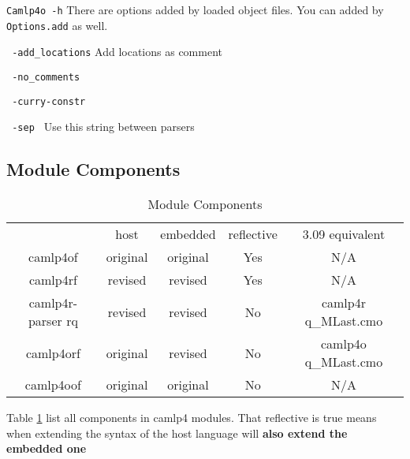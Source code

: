 \verb|Camlp4o -h| There are options added by loaded object files. You
can added by \verb|Options.add| as well.


\verb| -add_locations| Add locations as comment


\verb| -no_comments|


\verb| -curry-constr |


\verb| -sep | Use this string between parsers 




\subsection{Module Components}

\begin{table}
  \centering
  \begin{tabular}{|c|c|c|c|c|}
    \hline
                      & host     & embedded & reflective & 3.09 equivalent     \\
    camlp4of          & original & original & Yes        & N/A                 \\
    camlp4rf          & revised  & revised  & Yes        & N/A                 \\
    camlp4r-parser rq & revised  & revised  & No         & camlp4r q\_MLast.cmo \\
    camlp4orf         & original & revised  & No         & camlp4o q\_MLast.cmo \\
    camlp4oof         & original & original & No         & N/A                 \\
    \hline
  \end{tabular}
  \caption{Module Components}
  \label{tab:camlp4_module_components}
\end{table}

Table \ref{tab:camlp4_module_components} list all components in camlp4
modules. That reflective is true means when extending the syntax of the
host language will \textbf{ also extend the embedded one}


